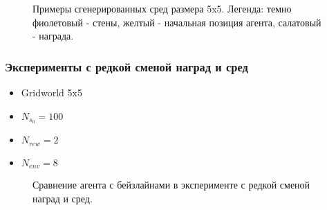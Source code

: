 \documentclass[a4paper]{article}
\begin{document}
\begin{figure}
  \centering
  \begin{minipage}{.49\linewidth}
    
  \end{minipage}
  \begin{minipage}{.49\linewidth}
    
  \end{minipage}
  \caption{Примеры сгенерированных сред размера 5x5. Легенда: темно фиолетовый - стены, желтый - начальная позиция агента, салатовый - награда.}
\end{figure}

\subsubsection{Эксперименты с редкой сменой наград и сред}

\begin{itemize}
  \item Gridworld 5x5
  \item $N_{s_0} = 100$
  \item $N_{rew} = 2$
  \item $N_{env} = 8$
\end{itemize}

\begin{figure}
  \centering
  \begin{minipage}{.49\linewidth}
    
  \end{minipage}
  \begin{minipage}{.49\linewidth}
    
  \end{minipage}
  \caption{Сравнение агента с бейзлайнами в эксперименте с редкой сменой наград и сред.}
\end{figure}
\end{document}

